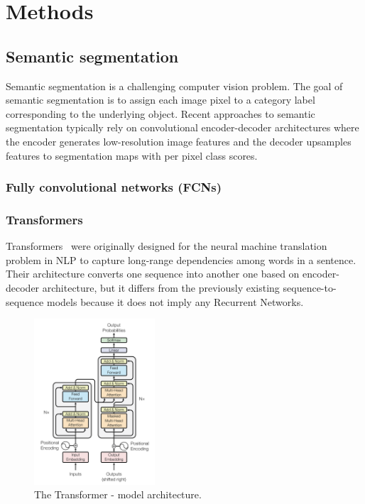\chapter{Methods}
\section{Semantic segmentation}
Semantic segmentation is a challenging computer vision problem. The goal of semantic segmentation is to assign each image pixel to a category label corresponding to the underlying object. Recent approaches to semantic segmentation typically rely on convolutional encoder-decoder architectures where the encoder generates low-resolution image features and the decoder upsamples features to segmentation maps with per pixel class scores. 
\subsection{Fully convolutional networks (FCNs)}


\subsection{Transformers}
Transformers~\cite{vaswani2017attention} were originally designed for the neural machine translation problem in NLP to capture long-range dependencies among words in a sentence. Their architecture converts one sequence into another one based on encoder-decoder architecture, but it differs from the previously existing sequence-to-sequence models because it does not imply any Recurrent Networks. 

\begin{figure}
  \begin{center}
    \includegraphics[width=0.4\textwidth]{figures/03_transformer_overview.png}
    \caption{The Transformer - model architecture. \cite{vaswani2017attention}}
    \label{fig:trans_arch}
  \end{center}
\end{figure}

